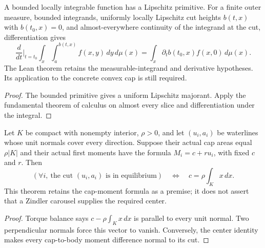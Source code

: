 \begin{lemma}
\label{lem:moving-cut-integral}
\leanok
{}
A bounded locally integrable function has a Lipschitz primitive.
For a finite outer measure, bounded integrands, uniformly locally Lipschitz
cut heights $b(t,x)$ with $b(t_0,x)=0$, and almost-everywhere continuity of
the integrand at the cut, differentiation gives
\[
 \frac{d}{dt}\bigg|_{t=t_0}\int_x\int_a^{b(t,x)}f(x,y)\,dy\,d\mu(x)
 =\int_x \partial_t b(t_0,x)f(x,0)\,d\mu(x).
\]
The Lean theorem retains the measurable-integrand and derivative hypotheses.
Its application to the concrete convex cap is still required.
\end{lemma}
\begin{proof}
\leanok
The bounded primitive gives a uniform Lipschitz majorant. Apply the fundamental
theorem of calculus on almost every slice and differentiation under the integral.
\end{proof}

\begin{lemma}
\label{lem:buoyancy-center}
\leanok
{}
Let $K$ be compact with nonempty interior, $\rho>0$, and let $(u_i,a_i)$
be waterlines whose unit normals cover every direction. Suppose their actual
cap areas equal $\rho|K|$ and their actual first moments have the formula
$M_i=c+r u_i$, with fixed $c$ and $r$. Then
\[
 (\forall i,\ \text{the cut }(u_i,a_i)\text{ is in equilibrium})
 \quad\Longleftrightarrow\quad c=\rho\int_K x\,dx.
\]
This theorem retains the cap-moment formula as a premise; it does not assert
that a Zindler carousel supplies the required center.
\end{lemma}
\begin{proof}
\leanok
Torque balance says $c-\rho\int_Kx\,dx$ is parallel to every unit normal.
Two perpendicular normals force this vector to vanish. Conversely, the
center identity makes every cap-to-body moment difference normal to its cut.
\end{proof}

